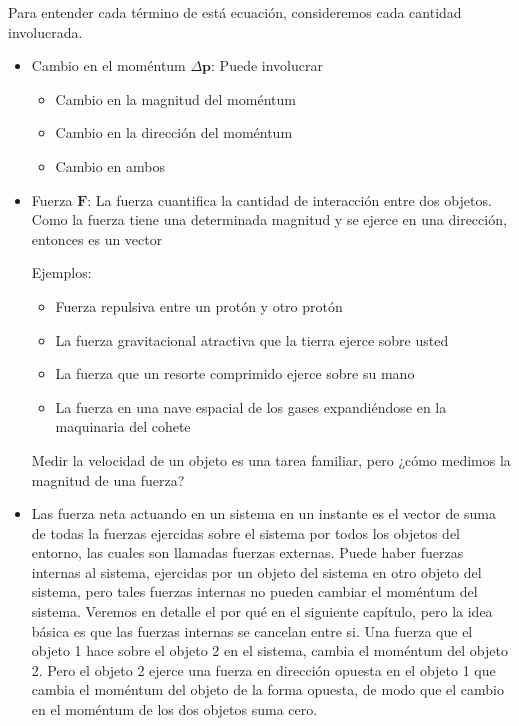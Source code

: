 Para entender cada término de está ecuación, consideremos cada cantidad involucrada. 
\begin{itemize}
\item Cambio en el moméntum $\Delta\mathbf{p}$: Puede involucrar
  \begin{itemize}
  \item Cambio en la magnitud del moméntum
  \item Cambio en la dirección del moméntum
  \item Cambio en ambos
  \end{itemize}
\item Fuerza $\mathbf{F}$: La fuerza cuantifica la cantidad de interacción entre dos objetos. Como la fuerza tiene una determinada magnitud y se ejerce en una dirección, entonces es un vector

Ejemplos:
\begin{itemize}
\item Fuerza repulsiva entre un protón y otro protón
\item La fuerza gravitacional atractiva que la tierra ejerce sobre usted
\item La fuerza que un resorte comprimido ejerce sobre su mano
\item La fuerza en una nave espacial de los gases expandiéndose en la maquinaria del cohete
\end{itemize}
Medir la velocidad de un objeto es una tarea familiar, pero ¿cómo medimos la magnitud de una fuerza?

\item Las fuerza neta actuando en un sistema en un instante es el vector de
suma de todas la fuerzas ejercidas sobre el sistema por todos los
objetos del entorno, las cuales son llamadas fuerzas externas. Puede
haber fuerzas internas al sistema, ejercidas por un objeto del sistema
en otro objeto del sistema, pero tales fuerzas internas no pueden
cambiar el moméntum del sistema. Veremos en detalle el por qué en
el siguiente capítulo, pero la idea básica es que las fuerzas internas
se cancelan entre si. Una fuerza que el objeto 1 hace sobre el objeto
2 en el sistema, cambia el moméntum del objeto 2. Pero el objeto 2
ejerce una fuerza en dirección opuesta en el objeto 1 que cambia el
moméntum del objeto de la forma opuesta, de modo que el cambio en el
moméntum de los dos objetos suma cero.

\end{itemize}




